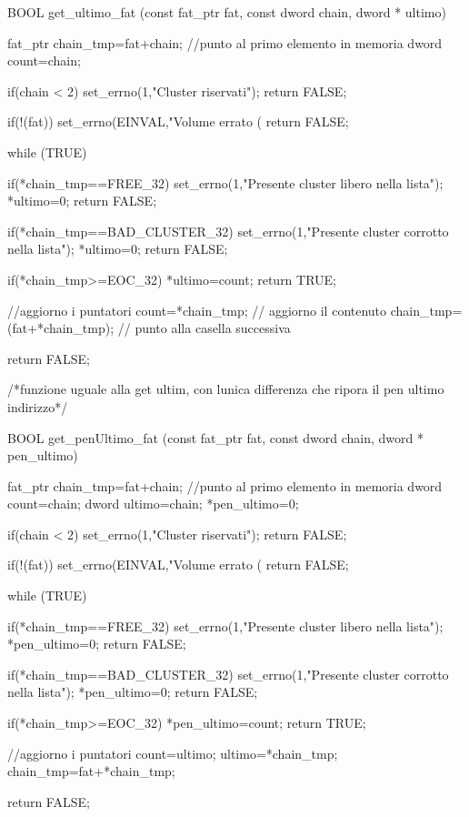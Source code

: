 BOOL get_ultimo_fat (const fat_ptr fat, const dword chain,  dword * ultimo){
  

 fat_ptr chain_tmp=fat+chain; //punto al primo elemento in memoria
 dword count=chain;
 
  if(chain < 2) {
    set_errno(1,"Cluster riservati");
    return FALSE; 
  } 
 
 if(!(fat)) {
    set_errno(EINVAL,"Volume errato (%
    return FALSE; 
  }
 
 while (TRUE) { 
   
   if(*chain_tmp==FREE_32) { 
    set_errno(1,"Presente cluster libero nella lista"); 
    *ultimo=0;
    return FALSE; 
   }
  
  if(*chain_tmp==BAD_CLUSTER_32) { 
    set_errno(1,"Presente cluster corrotto nella lista"); 
    *ultimo=0; 
    return FALSE; 
  }
   
  if(*chain_tmp>=EOC_32) {
    *ultimo=count;
    return TRUE; 
  }
  
  //aggiorno i puntatori 
  count=*chain_tmp; // aggiorno il contenuto 
  chain_tmp=(fat+*chain_tmp); // punto alla casella successiva
   
 }
 
 return FALSE;
}

/*funzione uguale alla get ultim, con lunica differenza che ripora il pen ultimo indirizzo*/ 

BOOL get_penUltimo_fat (const fat_ptr fat, const dword chain,  dword * pen_ultimo){
  
 fat_ptr chain_tmp=fat+chain; //punto al primo elemento in memoria
 dword count=chain;
 dword ultimo=chain; 
 *pen_ultimo=0; 
 
  if(chain < 2) {
    set_errno(1,"Cluster riservati");
    return FALSE; 
  }  
 
 if(!(fat)) {
    set_errno(EINVAL,"Volume errato (%
    return FALSE; 
  }
 
 
 while (TRUE) { 
   
   if(*chain_tmp==FREE_32) { 
    set_errno(1,"Presente cluster libero nella lista"); 
    *pen_ultimo=0;
    return FALSE; 
   }
  
  if(*chain_tmp==BAD_CLUSTER_32) { 
    set_errno(1,"Presente cluster corrotto nella lista"); 
    *pen_ultimo=0; 
    return FALSE; 
  }
   
   
  if(*chain_tmp>=EOC_32) {
    *pen_ultimo=count;
    return TRUE; 
  }
  
  //aggiorno i puntatori 
  count=ultimo;
  ultimo=*chain_tmp; 
  chain_tmp=fat+*chain_tmp;
   
 }
 
 return FALSE;
}




